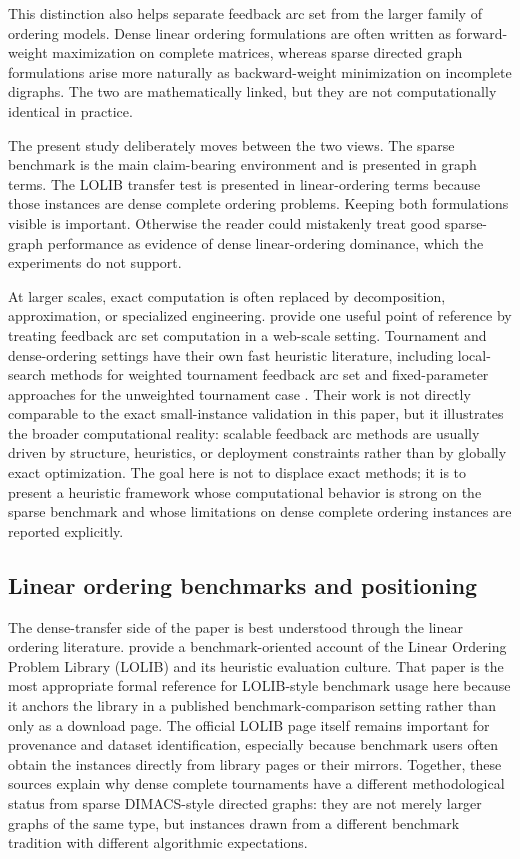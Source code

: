 This distinction also helps separate feedback arc set from the larger family of ordering models. Dense linear ordering formulations are often written as forward-weight maximization on complete matrices, whereas sparse directed graph formulations arise more naturally as backward-weight minimization on incomplete digraphs. The two are mathematically linked, but they are not computationally identical in practice.

The present study deliberately moves between the two views. The sparse benchmark is the main claim-bearing environment and is presented in graph terms. The LOLIB transfer test is presented in linear-ordering terms because those instances are dense complete ordering problems. Keeping both formulations visible is important. Otherwise the reader could mistakenly treat good sparse-graph performance as evidence of dense linear-ordering dominance, which the experiments do not support.

At larger scales, exact computation is often replaced by decomposition, approximation, or specialized engineering. \cite{SST16} provide one useful point of reference by treating feedback arc set computation in a web-scale setting. Tournament and dense-ordering settings have their own fast heuristic literature, including local-search methods for weighted tournament feedback arc set \cite{FLRS10} and fixed-parameter approaches for the unweighted tournament case \cite{ALS09}. Their work is not directly comparable to the exact small-instance validation in this paper, but it illustrates the broader computational reality: scalable feedback arc methods are usually driven by structure, heuristics, or deployment constraints rather than by globally exact optimization. The goal here is not to displace exact methods; it is to present a heuristic framework whose computational behavior is strong on the sparse benchmark and whose limitations on dense complete ordering instances are reported explicitly.

\subsection{Linear ordering benchmarks and positioning}

The dense-transfer side of the paper is best understood through the linear ordering literature. \cite{MRD12} provide a benchmark-oriented account of the Linear Ordering Problem Library (LOLIB) and its heuristic evaluation culture. That paper is the most appropriate formal reference for LOLIB-style benchmark usage here because it anchors the library in a published benchmark-comparison setting rather than only as a download page. The official LOLIB page itself \cite{lolib_library} remains important for provenance and dataset identification, especially because benchmark users often obtain the instances directly from library pages or their mirrors. Together, these sources explain why dense complete tournaments have a different methodological status from sparse DIMACS-style directed graphs: they are not merely larger graphs of the same type, but instances drawn from a different benchmark tradition with different algorithmic expectations.

